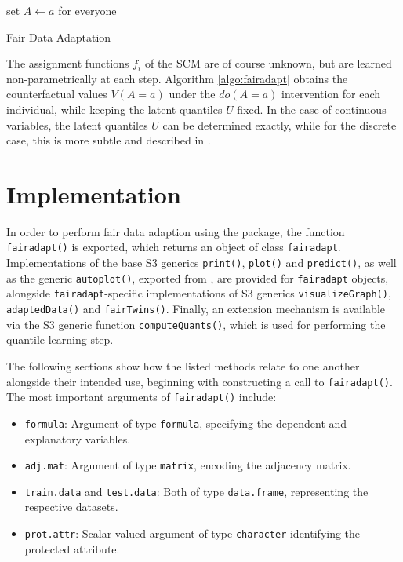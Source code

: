 \documentclass[
  nojss]{jss}
\providecommand{\tightlist}{%
  \setlength{\itemsep}{0pt}\setlength{\parskip}{0pt}}
\begin{document}
\begin{algorithm}
    \DontPrintSemicolon
    set $A \gets a$ for everyone\\
    \caption{Fair Data Adaptation}
    \label{algo:fairadapt}
\end{algorithm}

The assignment functions \(f_i\) of the SCM are of course unknown, but
are learned non-parametrically at each step. Algorithm
\ref{algo:fairadapt} obtains the counterfactual values \(V(A = a)\)
under the \(do(A = a)\) intervention for each individual, while keeping
the latent quantiles \(U\) fixed. In the case of continuous variables,
the latent quantiles \(U\) can be determined exactly, while for the
discrete case, this is more subtle and described in
\citet[Section~5]{plecko2020fair}.

\hypertarget{implementation}{%
\section{Implementation}\label{implementation}}

In order to perform fair data adaption using the 
package, the function \texttt{fairadapt()} is exported, which returns an
object of class \texttt{fairadapt}. Implementations of the base
 S3 generics \texttt{print()}, \texttt{plot()} and
\texttt{predict()}, as well as the generic \texttt{autoplot()}, exported
from  \citep{wickham2016ggplot2}, are provided for
\texttt{fairadapt} objects, alongside \texttt{fairadapt}-specific
implementations of S3 generics \texttt{visualizeGraph()},
\texttt{adaptedData()} and \texttt{fairTwins()}. Finally, an extension
mechanism is available via the S3 generic function
\texttt{computeQuants()}, which is used for performing the quantile
learning step.

The following sections show how the listed methods relate to one another
alongside their intended use, beginning with constructing a call to
\texttt{fairadapt()}. The most important arguments of
\texttt{fairadapt()} include:

\begin{itemize}
\tightlist
\item
  \texttt{formula}: Argument of type \texttt{formula}, specifying the
  dependent and explanatory variables.
\item
  \texttt{adj.mat}: Argument of type \texttt{matrix}, encoding the
  adjacency matrix.
\item
  \texttt{train.data} and \texttt{test.data}: Both of type
  \texttt{data.frame}, representing the respective datasets.
\item
  \texttt{prot.attr}: Scalar-valued argument of type \texttt{character}
  identifying the protected attribute.
\end{itemize}
\end{document}
